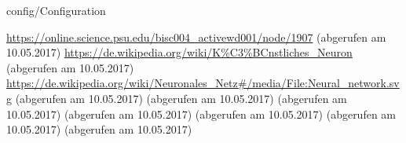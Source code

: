 \documentclass[12pt,headsepline,oneside,ngerman]{scrreprt}
\begin{document}
\graphicspath{{figures/}}

 {config/Configuration}
\pagestyle{headings}






%
%
%
%
%
%


%

\cleardoublepage
\begin{thebibliography}{xxxxx}
\url{https://online.science.psu.edu/bisc004_activewd001/node/1907} (abgerufen am 10.05.2017)
\url{https://de.wikipedia.org/wiki/K%C3%BCnstliches_Neuron} (abgerufen am 10.05.2017)
\url{https://de.wikipedia.org/wiki/Neuronales_Netz#/media/File:Neural_network.svg} (abgerufen am 10.05.2017)
\url{} (abgerufen am 10.05.2017)
\url{} (abgerufen am 10.05.2017)
\url{} (abgerufen am 10.05.2017)
\url{} (abgerufen am 10.05.2017)
\url{} (abgerufen am 10.05.2017)
\url{} (abgerufen am 10.05.2017)


\end{thebibliography}
\renewcommand{\bibname}{Literaturverzeichnis}

%

\cleardoublepage
{}
\listoffigures
\end{document}
